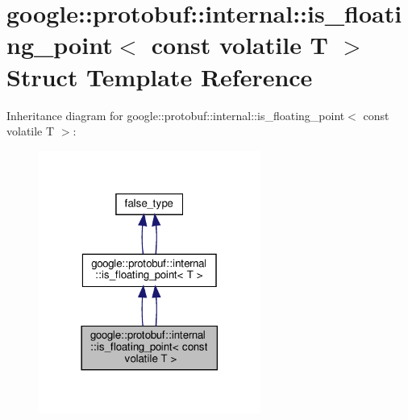 \hypertarget{structgoogle_1_1protobuf_1_1internal_1_1is__floating__point_3_01const_01volatile_01T_01_4}{}\section{google\+:\+:protobuf\+:\+:internal\+:\+:is\+\_\+floating\+\_\+point$<$ const volatile T $>$ Struct Template Reference}
\label{structgoogle_1_1protobuf_1_1internal_1_1is__floating__point_3_01const_01volatile_01T_01_4}


Inheritance diagram for google\+:\+:protobuf\+:\+:internal\+:\+:is\+\_\+floating\+\_\+point$<$ const volatile T $>$\+:
\nopagebreak
\begin{figure}[H]
\begin{center}
\leavevmode
\includegraphics[width=206pt]{structgoogle_1_1protobuf_1_1internal_1_1is__floating__point_3_01const_01volatile_01T_01_4__inherit__graph}
\end{center}
\end{figure}



